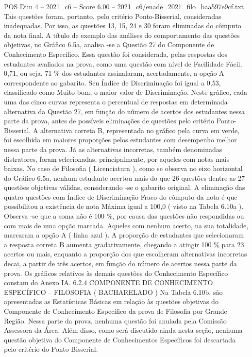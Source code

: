\begin{textsample}{POS Dim 4 – 2021\_c6 – Score 6.00 – 2021\_c6/enade\_2021\_filo\_baa597e9cf.txt}
Tais questões foram, portanto, pelo critério Ponto-Bisserial, consideradas inadequadas.
Por isso, as questões 13, 15, 24 e 30 foram eliminadas do cômputo da nota final.
A título de exemplo das análises do comportamento das questões objetivas, no Gráfico 6.5a, analisa -se a Questão 27 do Componente de Conhecimento Específico.
Essa questão foi considerada, pelas respostas dos estudantes avaliados na prova, como uma questão com nível de Facilidade Fácil, 0,71, ou seja, 71 \% dos estudantes assinalaram, acertadamente, a opção A correspondente ao gabarito.
Seu Índice de Discriminação foi igual a 0,53, classificado como Muito bom, o maior valor de Discriminação.
Neste gráfico, cada uma das cinco curvas representa o percentual de respostas em determinada alternativa da Questão 27, em função do número de acertos dos estudantes nessa parte da prova, antes de possíveis eliminações de questões pelo critério Ponto-Bisserial.
A alternativa correta B, representada no gráfico pela curva em verde, foi escolhida em maiores proporções pelos estudantes com desempenho melhor nessa parte da prova.
Já as alternativas incorretas, também denominadas distratores, foram selecionadas, principalmente, por aqueles com notas mais baixas.
No caso de Filosofia ( Licenciatura ), como se observa no eixo horizontal do Gráfico 6.5a, nenhum estudante acertou mais do que 26 questões dentre as 27 questões objetivas válidas, considerando -se o gabarito original.
A eliminação das quatro questões com Índice de Discriminação Fraco do cômputo da nota é que possibilitou a existência de nota Máxima igual a 100,0 ( visto na Tabela 6.10a ).
Observa -se que a soma não é 100 \%, por causa das questões não respondidas ou com mais de uma opção marcada.
Aqueles com nenhum acerto, na sua totalidade, marcaram a opção A ( linha azul ).
A proporção de estudantes que selecionaram a resposta correta B aumenta gradativamente, chegando a atingir 100 \% para 23 acertos ou mais, enquanto a proporção dos que escolheram alternativas incorretas decai, a partir de três acertos, em função do número de acertos nessa parte da prova.
Os gráficos relativos às demais questões do Conhecimento Específico constam do Anexo IA. 6.2.4 COMPONENTE DE CONHECIMENTO ESPECÍFICO – FILOSOFIA ( BACHARELADO ) Na Tabela 6.10b, são apresentadas as Estatísticas Básicas em relação às questões objetivas do Componente de Conhecimento Específico da prova de Filosofia por Grande Região.
Nessa parte da prova, nenhuma questão foi anulada pela Comissão Assessora da Área.
Além disso, como será discutido ainda nesta seção, nenhuma questão objetiva do Componente de Conhecimentos Específicos foi descartada pelo critério do Ponto-Bisserial.

\end{textsample}
